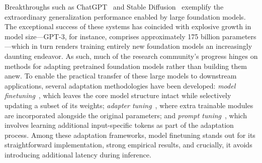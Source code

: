 Breakthroughs such as ChatGPT~\cite{brown2020language,chen2021evaluating} and Stable Diffusion~\cite{rombach2022high} exemplify the extraordinary generalization performance enabled by large foundation models. The exceptional success of these systems has coincided with explosive growth in model size—GPT-3, for instance, comprises approximately 175 billion parameters—which in turn renders training entirely new foundation models an increasingly daunting endeavor. As such, much of the research community's progress hinges on methods for adapting pretrained foundation models rather than building them anew. To enable the practical transfer of these large models to downstream applications, several adaptation methodologies have been developed: \emph{model finetuning}~\cite{hulora2022,zaken2022bitfit,guo2020parameter,raffel2020exploring,qiu2023controlling,zhang2022adaptive,chavan2023one}, which leaves the core model structure intact while selectively updating a subset of its weights; \emph{adapter tuning}~\cite{rebuffi2017learning,houlsby2019parameter,pfeiffer2020adapterfusion,lin2020exploring,he2021towards}, where extra trainable modules are incorporated alongside the original parameters; and \emph{prompt tuning}~\cite{li2021prefix,lester2021power}, which involves learning additional input-specific tokens as part of the adaptation process. Among these adaptation frameworks, model finetuning stands out for its straightforward implementation, strong empirical results, and crucially, it avoids introducing additional latency during inference.

